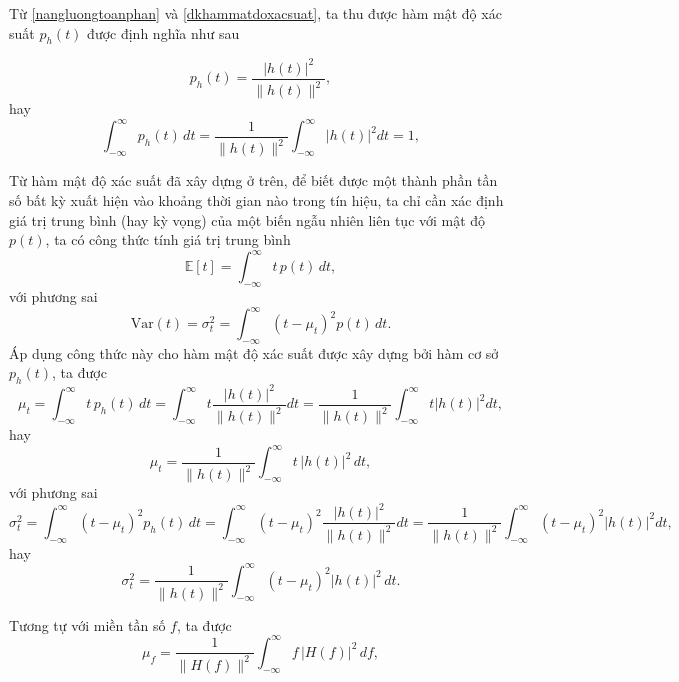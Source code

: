 \documentclass[12pt, a4paper]{report}
\begin{document}
Từ \ref{nangluongtoanphan} và \ref{dkhammatdoxacsuat}, ta thu được hàm mật độ xác suất $p_h(t)$ được định nghĩa như sau

\begin{equation}
    p_h(t) = \frac{|h(t)|^{2}}{\|h(t)\|^{2}},
\end{equation}
hay
\begin{equation}
    \int_{-\infty}^{\infty} p_h(t)\,dt = \frac{1}{\|h(t)\|^{2}}\int_{-\infty}^{\infty}|h(t)|^{2}dt = 1, 
\end{equation}

Từ hàm mật độ xác suất đã xây dựng ở trên, để biết được một thành phần tần số bất kỳ xuất hiện vào khoảng thời gian nào trong tín hiệu, ta chỉ cần xác định giá trị trung bình (hay kỳ vọng) của một biến ngẫu nhiên liên tục với mật độ $p(t)$, ta có công thức tính giá trị trung bình
\begin{equation}
    \mathbb{E}[t] = \int_{-\infty}^{\infty} t\,p(t)\,dt,
\end{equation}
với phương sai
\begin{equation}
    \mathrm{Var}(t) = \sigma_t^2 = \int_{-\infty}^{\infty} (t - \mu_t)^2 p(t)\,dt.
\end{equation}
Áp dụng công thức này cho hàm mật độ xác suất được xây dựng bởi hàm cơ sở $p_h(t)$, ta được
\begin{equation}
    \mu_t
= \int_{-\infty}^{\infty} t\,p_h(t)\,dt
= \int_{-\infty}^{\infty} t \frac{|h(t)|^{2}}{\|h(t)\|^{2}}dt
= \frac{1}{\|h(t)\|^{2}} \int_{-\infty}^{\infty} t |h(t)|^{2}dt,
\end{equation}
hay
\begin{equation}
    \mu_t = \frac{1}{\|h(t)\|^2} \int_{-\infty}^{\infty} t\,|h(t)|^2 \, dt,
\end{equation}
với phương sai
\begin{equation}
    \sigma_t^2
= \int_{-\infty}^{\infty} (t - \mu_t)^2 p_h(t)\,dt
= \int_{-\infty}^{\infty} (t-\mu_t)^2 \frac{|h(t)|^{2}}{\|h(t)\|^{2}} dt
= \frac{1}{\|h(t)\|^{2}} \int_{-\infty}^{\infty} (t-\mu_t)^2 |h(t)|^{2} dt,
\end{equation}
hay
\begin{equation}
    \sigma_t^2 = \frac{1}{\|h(t)\|^2} \int_{-\infty}^{\infty} (t - \mu_t)^2 |h(t)|^2 \, dt.
\end{equation}

Tương tự với miền tần số $f$, ta được
\begin{equation}
    \mu_f = \frac{1}{\|H(f)\|^2} \int_{-\infty}^{\infty} f\,|H(f)|^2 \, df,
\end{equation}
\end{document}
